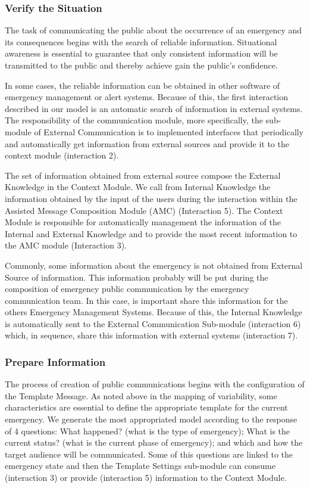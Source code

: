 \subsubsection{Verify the Situation}


The task of communicating the public about the occurrence of an emergency and its consequences begins with the search of reliable information. Situational awareness is essential to guarantee that only consistent information will be transmitted to the public and thereby achieve gain the public's confidence. 

In some cases, the reliable information can be obtained in other software of emergency management or alert systems. Because of this, the first interaction described in our model is an automatic search of information in external systems. The responsibility of the communication module, more specifically, the sub-module of External Communication is to implemented interfaces that periodically and automatically get information from external sources and provide it to the context module (interaction 2). 

The set of information obtained from external source compose the External Knowledge in the Context Module. We call from Internal Knowledge the information obtained by the input of the users during the interaction within the Assisted Message Composition Module (AMC) (Interaction 5). The Context Module is responsible for automatically management the information of the Internal and External Knowledge and to provide the most recent information to the AMC module (Interaction 3).

Commonly, some information about the emergency is not obtained from External Source of information. This information probably will be put during the composition of emergency public communication by the emergency communication team. In this case, is important share this information for the others Emergency Management Systems. Because of this, the Internal Knowledge is automatically sent to the External Communication Sub-module (interaction 6) which, in sequence, share this information with external systems (interaction 7).




\subsubsection{Prepare Information}




The process of creation of public communications begins with the configuration of the Template Message. As noted above in the mapping of variability, some characteristics are essential to define the appropriate template for the current emergency. We generate the most appropriated model according to the response of 4 questions: What happened? (what is the type of emergency); What is the current status? (what is the current phase of emergency); and which and how the target audience will be communicated. Some of this questions are linked to the emergency state and then the Template Settings sub-module can consume (interaction 3) or provide (interaction 5) information to the Context Module. 

